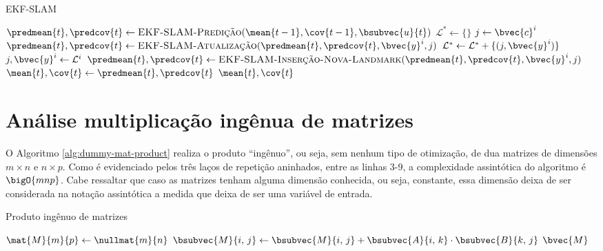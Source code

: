 \begin{algorithm}[h]
  \caption{EKF-SLAM}
  \label{alg:ekf-slam-full}
\begin{algorithmic}[1]
    \State $\predmean{t}, \predcov{t} \gets \textproc{EKF-SLAM-Predição}(\mean{t-1}, \cov{t-1}, \bsubvec{u}{t})$
    \State $\mathcal{L}^{*} \gets \{\}$ 
      \State $j \gets \bvec{c}^i$
        \State $\predmean{t}, \predcov{t} \gets \textproc{EKF-SLAM-Atualização}(\predmean{t}, \predcov{t}, \bvec{y}^i, j)$
      \Else
        \State $\mathcal{L}^* \gets \mathcal{L}^* + \{(j, \bvec{y}^i)\}$
      \EndIf
    \EndFor
      \State $j, \bvec{y}^i \gets \mathcal{L}^i$
      \State $\predmean{t}, \predcov{t} \gets \textproc{EKF-SLAM-Inserção-Nova-Landmark}(\predmean{t}, \predcov{t}, \bvec{y}^i, j)$
    \EndFor
    \State $\mean{t}, \cov{t} \gets \predmean{t}, \predcov{t}$
    \State \Return $\mean{t}, \cov{t}$
  \EndProcedure
\end{algorithmic}
\end{algorithm}

\clearpage

\section{Análise multiplicação ingênua de matrizes}
\label{app:matrix-product-analysis}
O Algoritmo \ref{alg:dummy-mat-product} realiza o produto ``ingênuo'', ou seja, sem nenhum tipo de otimização, de dua matrizes de dimensões $m\times n$ e $n\times p$. Como é evidenciado pelos três laços de 
repetição aninhados, entre as linhas 3-9, a complexidade assintótica do algoritmo é $\bigO{mnp}$. Cabe ressaltar que caso as matrizes tenham 
alguma dimensão conhecida, ou seja, constante, essa dimensão deixa 
de ser considerada na notação assintótica a medida que deixa de ser 
uma variável de entrada.

\begin{algorithm}
  \caption{Produto ingênuo de matrizes}
  \label{alg:dummy-mat-product}
\begin{algorithmic}[1]
\State $\mat{M}{m}{p} \gets \nullmat{m}{n}$
      \State $\bsubvec{M}{i,\, j} \gets \bsubvec{M}{i,\,j} + \bsubvec{A}{i,\,k} \cdot \bsubvec{B}{k,\,j}$
    \EndFor
  \EndFor
\EndFor
\State \Return $\bvec{M}$
\EndProcedure
\end{algorithmic}
\end{algorithm}